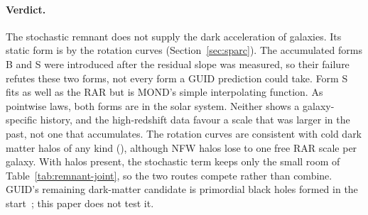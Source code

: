 \paragraph{Verdict.} The stochastic remnant does not supply the dark acceleration of galaxies. Its static form is  by the
rotation curves (Section~\ref{sec:sparc}). The accumulated forms B and S were introduced after the residual slope was measured, so their
failure refutes these two forms, not every form a GUID prediction could take. Form S fits as well as the RAR but is MOND's simple
interpolating function. As pointwise laws, both forms are  in the solar system. Neither shows a galaxy-specific history, and the
high-redshift data favour a scale that was larger in the past, not one that accumulates. The rotation curves are consistent with cold dark
matter halos of any kind (), although NFW halos lose to one free RAR scale per galaxy. With halos present, the stochastic term keeps
only the small room of Table~\ref{tab:remnant-joint}, so the two routes compete rather than combine. GUID's remaining dark-matter candidate is
primordial black holes formed in the start~\cite{cotner}; this paper does not test it.
